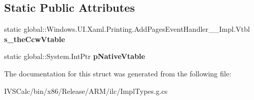 \subsection*{Static Public Attributes}
\begin{DoxyCompactItemize}
\item 
\mbox{\label{struct_windows_1_1_u_i_1_1_xaml_1_1_printing_1_1_add_pages_event_handler_____impl_1_1_vtbl_abcbf4913a74d7b7f317d8304f6ddd60d}} 
static global\+::\+Windows.\+U\+I.\+Xaml.\+Printing.\+Add\+Pages\+Event\+Handler\+\_\+\+\_\+\+Impl.\+Vtbl {\bfseries s\+\_\+the\+Ccw\+Vtable}
\item 
\mbox{\label{struct_windows_1_1_u_i_1_1_xaml_1_1_printing_1_1_add_pages_event_handler_____impl_1_1_vtbl_a8cad8e377242c4e317054f56965f27c7}} 
static global\+::\+System.\+Int\+Ptr {\bfseries p\+Native\+Vtable}
\end{DoxyCompactItemize}


The documentation for this struct was generated from the following file\+:\begin{DoxyCompactItemize}
\item 
I\+V\+S\+Calc/bin/x86/\+Release/\+A\+R\+M/ilc/Impl\+Types.\+g.\+cs\end{DoxyCompactItemize}
